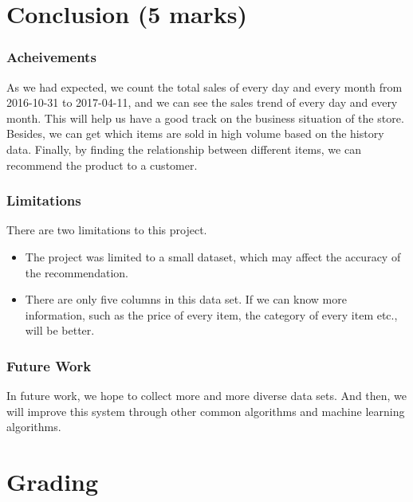 \documentclass[11pt]{article}
\providecommand{\tightlist}{%
      \setlength{\itemsep}{0pt}\setlength{\parskip}{0pt}}
\begin{document}
    
    \hypertarget{conclusion-5-marks}{%
\section{Conclusion (5 marks)}\label{conclusion-5-marks}}

\hypertarget{acheivements}{%
\subsubsection{Acheivements}\label{acheivements}}

As we had expected, we count the total sales of every day and every
month from 2016-10-31 to 2017-04-11, and we can see the sales trend of
every day and every month. This will help us have a good track on the
business situation of the store. Besides, we can get which items are
sold in high volume based on the history data. Finally, by finding the
relationship between different items, we can recommend the product to a
customer.

\hypertarget{limitations}{%
\subsubsection{Limitations}\label{limitations}}

There are two limitations to this project.

\begin{itemize}
\tightlist
\item
  The project was limited to a small dataset, which may affect the
  accuracy of the recommendation.
\item
  There are only five columns in this data set. If we can know more
  information, such as the price of every item, the category of every
  item etc., will be better.
\end{itemize}

\hypertarget{future-work}{%
\subsubsection{Future Work}\label{future-work}}

In future work, we hope to collect more and more diverse data sets. And
then, we will improve this system through other common algorithms and
machine learning algorithms.

    \hypertarget{grading}{%
\section{Grading}\label{grading}}
\end{document}
